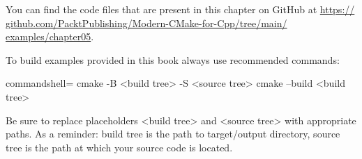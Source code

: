 You can find the code files that are present in this chapter on GitHub at \url{https:// github.com/PacktPublishing/Modern-CMake-for-Cpp/tree/main/ examples/chapter05}.

To build examples provided in this book always use recommended commands:

\begin{tcblisting}{commandshell={}}
	cmake -B <build tree> -S <source tree>
	cmake --build <build tree>
\end{tcblisting}

Be sure to replace placeholders <build tree> and <source tree> with appropriate paths. As a reminder: build tree is the path to target/output directory, source tree is the path at which your source code is located.